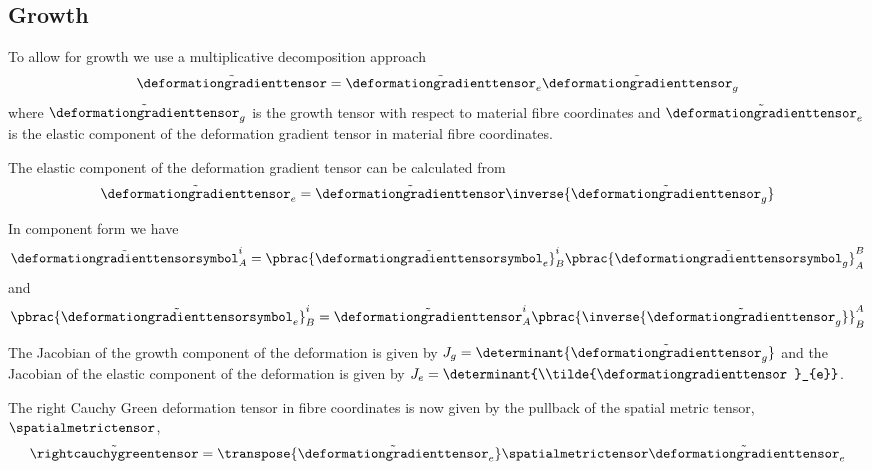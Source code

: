 \subsection{Growth}
\label{subsec:FiniteElasticityGrowth}

To allow for growth we use a multiplicative decomposition approach \ie
\begin{equation}
  \tilde{\deformationgradienttensor}=\tilde{\deformationgradienttensor}_{e}\tilde{\deformationgradienttensor}_{g}
\end{equation}
where $\tilde{\deformationgradienttensor}_{g}$ is the growth tensor
with respect to material fibre coordinates and
$\tilde{\deformationgradienttensor}_{e}$ is the elastic component of
the deformation gradient tensor in material fibre coordinates.

The elastic component of the deformation gradient tensor can be calculated
from
\begin{equation}
  \tilde{\deformationgradienttensor}_{e}=\tilde{\deformationgradienttensor}\inverse{\tilde{\deformationgradienttensor}_{g}}
\end{equation}

In component form we have
\begin{equation}
  \tilde{\deformationgradienttensorsymbol}^{i}_{A}=\pbrac{\tilde{\deformationgradienttensorsymbol}_{e}}^{i}_{B}
  \pbrac{\tilde{\deformationgradienttensorsymbol}_{g}}^{B}_{A}
\end{equation}
and
\begin{equation}
  \pbrac{\tilde{\deformationgradienttensorsymbol}_{e}}^{i}_{B}=\tilde{\deformationgradienttensor}^{i}_{A}
  \pbrac{\inverse{\tilde{\deformationgradienttensor}_{g}}}^{A}_{B}
\end{equation}

The Jacobian of the growth component of the deformation is given by
$J_{g}=\determinant{\tilde{\deformationgradienttensor}_{g}}$ and the
Jacobian of the elastic component of the deformation is given by
$J_{e}=\determinant{\\tilde{\deformationgradienttensor}_{e}}$.

The right Cauchy Green deformation tensor in fibre coordinates is now given by
the pullback of the spatial metric tensor, $\spatialmetrictensor$,
\begin{equation}
  \tilde{\rightcauchygreentensor}=
  \transpose{\tilde{\deformationgradienttensor}_{e}}\spatialmetrictensor\tilde{\deformationgradienttensor}_{e}
\end{equation}

